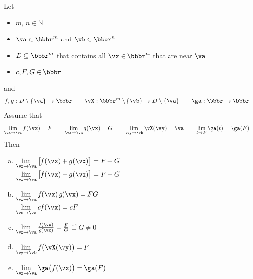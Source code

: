 \begin{theorem}\label{thm LIMpptiesB}
Let
\begin{itemize}%
\item[$\circ$]
$m$, $n\in\mathbb{N}$
\item[$\circ$]
$\va\in\bbbr^m$ and $\vb\in\bbbr^n$
\item[$\circ$]
$D\subseteq\bbbr^m$ that contains all $\vx\in\bbbr^m$ that are near $\va$
\item[$\circ$]
$c,F,G\in\bbbr$
\end{itemize}
and
\begin{equation*}
f,g:D\setminus\{\va\}\rightarrow\bbbr\qquad
\vX:\bbbr^m\setminus\{\vb\}\rightarrow D\setminus\{\va\}\qquad
\ga:\bbbr\rightarrow\bbbr
\end{equation*}
Assume that
\begin{equation*}
\lim_{\vx\to \va} f(\vx) = F\qquad
\lim_{\vx\to \va} g(\vx) = G\qquad
\lim_{\vy\to \vb} \vX(\vy) = \va\qquad
\lim_{t\to F} \ga(t) = \ga(F)
\end{equation*}
Then
\begin{enumerate}[(a)]
\item\qquad
$\lim\limits_{\vx\rightarrow \va}\big[f(\vx)+g(\vx)\big]
=F+G$\\
\null\qquad$\lim\limits_{\vx\rightarrow \va}\big[f(\vx)-g(\vx)\big]
=F-G$
\item\qquad
$\lim\limits_{\vx\rightarrow \va} f(\vx)\,g(\vx)
=FG$\\
\null\qquad$\lim\limits_{\vx\rightarrow \va} cf(\vx)
=cF$
\item\qquad
$\lim\limits_{\vx\rightarrow \va} \frac{f(\vx)}{g(\vx)}
=\frac{F}{G}$ if $G\ne 0$
\item\qquad
$\lim\limits_{\vy\rightarrow \vb} f\big(\vX(\vy)\big)
=F$
\item\qquad
$\lim\limits_{\vx\rightarrow \va} \ga\big(f(\vx)\big)
=\ga(F)$
\end{enumerate}
\end{theorem}
